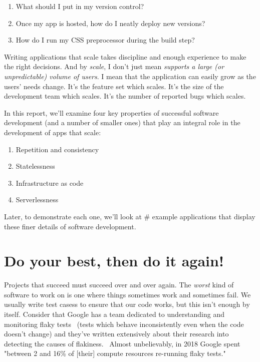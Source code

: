 \documentclass{article}
\newcommand{\noterm}[1]{\textit{#1}}
\newcommand{\term}[1]{\noterm{#1}\index{#1}}
\begin{document}
\begin{enumerate}
  \item What should I put in my version control?
  \item Once my app is hosted, how do I neatly deploy new versions?
  \item How do I run my CSS preprocessor during the build step?
\end{enumerate}
Writing applications that scale takes discipline and enough experience to make the right decisions.
And by \term{scale}, I don't just mean \noterm{supports a large (or unpredictable) volume of users}.
I mean that the application can easily grow as the users' needs change.
It's the feature set which scales.
It's the size of the development team which scales.
It's the number of reported bugs which scales.

In this report, we'll examine four key properties of successful software development (and a number of smaller ones) that play an integral role in the development of apps that scale:

\begin{enumerate}
  \item Repetition and consistency
  \item Statelessness
  \item Infrastructure as code
  \item Serverlessness
\end{enumerate}
Later, to demonstrate each one, we'll look at \# example applications that display these finer details of software development.

\section{Do your best, then do it again!}

Projects that succeed must succeed over and over again.
The \textit{worst} kind of software to work on is one where things sometimes work and sometimes fail.
We usually write test casess to ensure that our code works, but this isn't enough by itself.
Consider that Google has a team dedicated to understanding and monitoring flaky tests~\cite{google-flaky-blog} (tests which behave inconsistently even when the code doesn't change) and they've written extensively about their research into detecting the causes of flakiness.~\cite{google-deflake}
Almost unbelievably, in 2018 Google spent "between 2 and 16\% of [their] compute resources re-running flaky tests."~\cite{google-testing}
\end{document}
